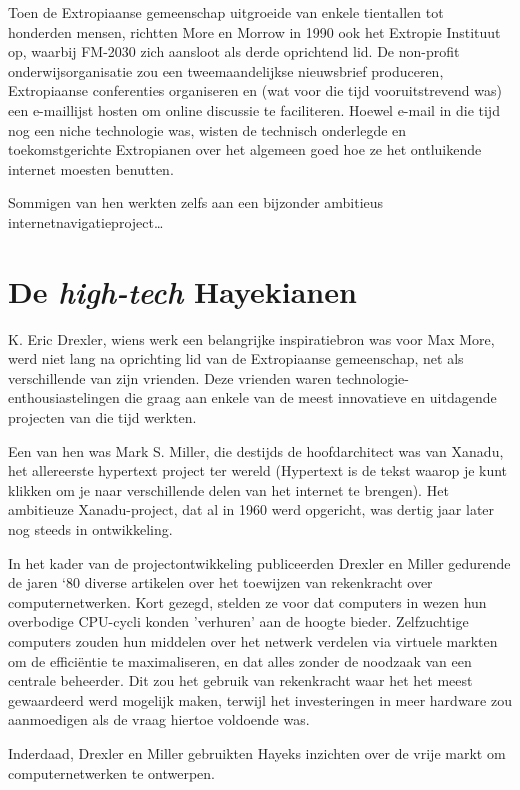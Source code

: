 \documentclass[
  a5paper,
  smalldemyvopaper,11pt,twoside,onecolumn,openright,extrafontsizes]{memoir}
\begin{document}
Toen de Extropiaanse gemeenschap uitgroeide van enkele tientallen tot
honderden mensen, richtten More en Morrow in 1990 ook het Extropie
Instituut op, waarbij FM-2030 zich aansloot als derde oprichtend lid. De
non-profit onderwijsorganisatie zou een tweemaandelijkse nieuwsbrief
produceren, Extropiaanse conferenties organiseren en (wat voor die tijd
vooruitstrevend was) een e-maillijst hosten om online discussie te
faciliteren. Hoewel e-mail in die tijd nog een niche technologie was,
wisten de technisch onderlegde en toekomstgerichte Extropianen over het
algemeen goed hoe ze het ontluikende internet moesten benutten.

Sommigen van hen werkten zelfs aan een bijzonder ambitieus
internetnavigatieproject\ldots{}

\section{\texorpdfstring{De \emph{high-tech}
Hayekianen}{De high-tech Hayekianen}}\label{de-high-tech-hayekianen}

K. Eric Drexler, wiens werk een belangrijke inspiratiebron was voor Max
More, werd niet lang na oprichting lid van de Extropiaanse gemeenschap,
net als verschillende van zijn vrienden. Deze vrienden waren
technologie-enthousiastelingen die graag aan enkele van de meest
innovatieve en uitdagende projecten van die tijd werkten.

Een van hen was Mark S. Miller, die destijds de hoofdarchitect was van
Xanadu, het allereerste hypertext project ter wereld (Hypertext is de
tekst waarop je kunt klikken om je naar verschillende delen van het
internet te brengen). Het ambitieuze Xanadu-project, dat al in 1960 werd
opgericht, was dertig jaar later nog steeds in ontwikkeling.

In het kader van de projectontwikkeling publiceerden Drexler en Miller
gedurende de jaren `80 diverse artikelen over het toewijzen van
rekenkracht over computernetwerken. Kort gezegd, stelden ze voor dat
computers in wezen hun overbodige CPU-cycli konden 'verhuren' aan de
hoogte bieder. Zelfzuchtige computers zouden hun middelen over het
netwerk verdelen via virtuele markten om de efficiëntie te
maximaliseren, en dat alles zonder de noodzaak van een centrale
beheerder. Dit zou het gebruik van rekenkracht waar het het meest
gewaardeerd werd mogelijk maken, terwijl het investeringen in meer
hardware zou aanmoedigen als de vraag hiertoe voldoende was.

Inderdaad, Drexler en Miller gebruikten Hayeks inzichten over de vrije
markt om computernetwerken te ontwerpen.
\end{document}
